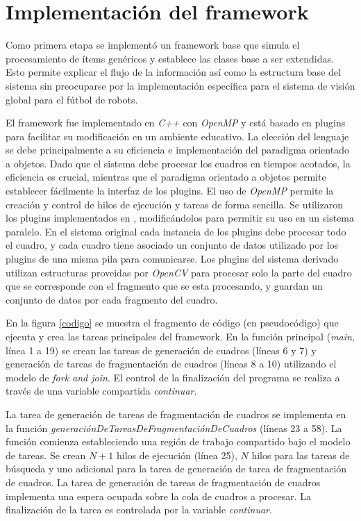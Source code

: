 \section{Implementación del framework}

\label{implementacionFramework}

Como primera etapa se implementó un framework base que simula el procesamiento de
ítems genéricos y establece las clases base a ser extendidas. Esto permite
explicar el flujo de la información así como la estructura base del sistema sin
preocuparse por la implementación específica para el sistema de visión global
para el fútbol de robots.

El framework fue implementado en \emph{C++} con \emph{OpenMP} y está basado en
plugins para facilitar su modificación en un ambiente educativo. La elección del
lenguaje se debe principalmente a su eficiencia e implementación del paradigma
orientado a objetos. Dado que el sistema debe procesar los cuadros en tiempos
acotados, la eficiencia es crucial, mientras que el paradigma orientado a
objetos permite establecer fácilmente la interfaz de los plugins. El uso de
\emph{OpenMP} permite la creación y control de hilos de ejecución y tareas de
forma sencilla. Se utilizaron los plugins implementados en \cite{torres2014},
modificándolos para permitir su uso en un sistema paralelo. En el sistema
original cada instancia de los plugins debe procesar todo el cuadro, y cada
cuadro tiene asociado un conjunto de datos utilizado por los plugins de una
misma pila para comunicarse. Los plugins del sistema derivado utilizan
estructuras proveidas por \emph{OpenCV} para procesar solo la parte del cuadro
que se corresponde con el fragmento que se esta procesando, y guardan un
conjunto de datos por cada fragmento del cuadro.

En la figura \ref{codigo} se muestra el fragmento de código (en pseudocódigo)
que ejecuta y crea las tareas principales del framework. En la función principal
(\emph{main}, línea 1 a 19) se crean las tareas de generación de cuadros (líneas
6 y 7) y generación de tareas de fragmentación de cuadros (líneas 8 a 10)
utilizando el modelo de \emph{fork and join}. El control de la finalización del
programa se realiza a través de una variable compartida \emph{continuar}.

La tarea de generación de tareas de fragmentación de cuadros se implementa en la
función \emph{generaciónDeTareasDeFragmentaciónDeCuadros} (líneas 23 a 58). La
función comienza estableciendo una región de trabajo compartido bajo el modelo
de tareas. Se crean $N+1$ hilos de ejecución (línea 25), $N$ hilos para las
tareas de búsqueda y uno adicional para la tarea de generación de tarea de
fragmentación de cuadros. La tarea de generación de tareas de fragmentación de
cuadros implementa una espera ocupada sobre la cola de cuadros a procesar. La
finalización de la tarea es controlada por la variable \emph{continuar}.

